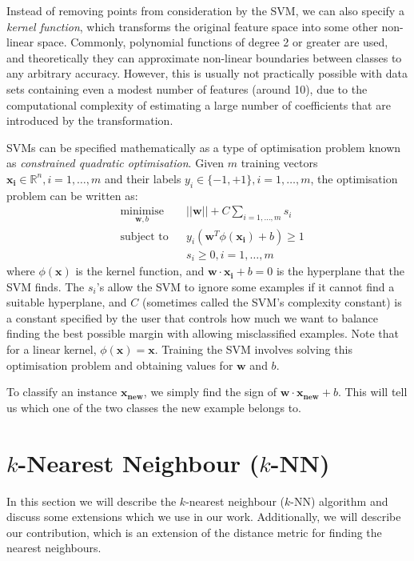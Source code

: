 \begin{figure}[h]
\label{fig:svm}
\caption{}
\centering
\end{figure}

Instead of removing points from consideration by the SVM, we can also specify
a \textit{kernel function}, which transforms the original feature space into
some other non-linear space. Commonly, polynomial functions of degree 2 or
greater are used, and theoretically they can approximate non-linear boundaries
between classes to any arbitrary accuracy. However, this is usually not
practically possible with data sets containing even a modest number of features
(around 10), due to the computational complexity of estimating a large number
of coefficients that are introduced by the transformation.

SVMs can be specified mathematically as a type of optimisation problem known
as \textit{constrained quadratic optimisation}. Given $m$ training vectors
$\mathbf{x_i} \in \mathbb{R}^n, i=1,\ldots,m$ and their labels
$y_i \in \{-1,+1\}, i=1,\ldots,m$, the optimisation problem can be written as:
\begin{equation}
\label{eqn:svm1}
\begin{aligned}
& \underset{\mathbf{w},b}{\mathrm{minimise}}
  && ||\mathbf{w}|| + C\sum_{i=1,\ldots,m} s_i \\
& \text{subject to}
  && y_i(\mathbf{w}^T\phi(\mathbf{x_i})+b) \geq 1 \\
& && s_i \geq 0, i = 1,\ldots,m
\end{aligned}
\end{equation}
where $\phi(\mathbf{x})$ is the kernel function, and
$\mathbf{w}\cdot\mathbf{x_i} + b = 0$ is the hyperplane that the SVM finds.
The $s_i$'s allow the SVM to ignore some examples if it cannot find a suitable
hyperplane, and $C$ (sometimes called the SVM's complexity constant) is a
constant specified by the user that controls how much we want to balance
finding the best possible margin with allowing misclassified examples.
Note that for a linear kernel, $\phi(\mathbf{x}) = \mathbf{x}$. Training the
SVM involves solving this optimisation problem and obtaining values for
$\mathbf{w}$ and $b$.

To classify an instance $\mathbf{x_{new}}$, we simply find the sign of
$\mathbf{w}\cdot\mathbf{x_{new}}+b$. This will tell us which one of the
two classes the new example belongs to.

\section{$k$-Nearest Neighbour ($k$-NN)}
In this section we will describe the $k$-nearest neighbour ($k$-NN) algorithm
and discuss some extensions which we use in our work. Additionally, we will
describe our contribution, which is an extension of the distance metric for
finding the nearest neighbours.

